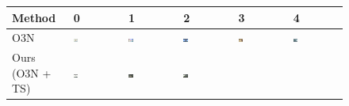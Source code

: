 \begin{figure}[t]
    \centering
        \begin{tabu} to \textwidth {|X[c,m]|X[c,m]X[c,m]X[c,m]X[c,m]X[c,m]|}
            \hline
            Method & 0 & 1 & 2 & 3 & 4 \\ \hline \hline
            O3N & 
            \includegraphics[width=0.1\textwidth]{images/o3vsmooth/o3/0.png}\vspace{2mm} & %
            \includegraphics[width=0.1\textwidth]{images/o3vsmooth/o3/1.png}\vspace{2mm} &
            \includegraphics[width=0.1\textwidth]{images/o3vsmooth/o3/2.png}\vspace{2mm} & 
            \includegraphics[width=0.1\textwidth]{images/o3vsmooth/o3/3.png}\vspace{2mm} &
            \includegraphics[width=0.1\textwidth]{images/o3vsmooth/o3/4.png}\vspace{2mm} \\
            Ours (O3N + TS) & 
            \includegraphics[width=0.1\textwidth]{images/o3vsmooth/smooth/0.png} &
            \includegraphics[width=0.1\textwidth]{images/o3vsmooth/smooth/1.png} &
            \includegraphics[width=0.1\textwidth]{images/o3vsmooth/smooth/2.png} & 

\end{tabu}
\end{figure}
